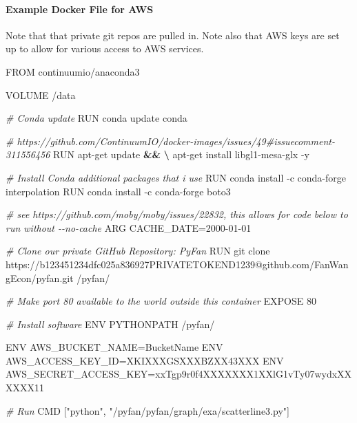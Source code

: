 \documentclass[
]{book}
\newenvironment{Shaded}{\begin{snugshade}}{\end{snugshade}}
\newcommand{\CommentTok}[1]{\textcolor[rgb]{0.56,0.35,0.01}{\textit{#1}}}
\newcommand{\ExtensionTok}[1]{#1}
\newcommand{\KeywordTok}[1]{\textcolor[rgb]{0.13,0.29,0.53}{\textbf{#1}}}
\newcommand{\NormalTok}[1]{#1}
\newcommand{\StringTok}[1]{\textcolor[rgb]{0.31,0.60,0.02}{#1}}
\begin{document}
\hypertarget{example-docker-file-for-aws}{%
\paragraph{Example Docker File for AWS}\label{example-docker-file-for-aws}}

Note that that private git repos are pulled in. Note also that AWS keys are set up to allow for various access to AWS services.

\begin{Shaded}
\begin{Highlighting}[]
\ExtensionTok{FROM}\NormalTok{ continuumio/anaconda3}

\ExtensionTok{VOLUME}\NormalTok{ /data}

\CommentTok{\# Conda update}
\ExtensionTok{RUN}\NormalTok{ conda update conda}

\CommentTok{\# https://github.com/ContinuumIO/docker{-}images/issues/49\#issuecomment{-}311556456}
\ExtensionTok{RUN}\NormalTok{ apt{-}get update }\KeywordTok{\&\&} \KeywordTok{\textbackslash{}}
    \ExtensionTok{apt{-}get}\NormalTok{ install libgl1{-}mesa{-}glx {-}y}

\CommentTok{\# Install Conda additional packages that i use}
\ExtensionTok{RUN}\NormalTok{ conda install {-}c conda{-}forge interpolation}
\ExtensionTok{RUN}\NormalTok{ conda install {-}c conda{-}forge boto3}

\CommentTok{\# see https://github.com/moby/moby/issues/22832, this allows for code below to run without {-}{-}no{-}cache}
\ExtensionTok{ARG}\NormalTok{ CACHE\_DATE=2000{-}01{-}01}

\CommentTok{\# Clone our private GitHub Repository: PyFan}
\ExtensionTok{RUN}\NormalTok{ git clone https://b123451234dfc025a836927PRIVATETOKEND1239@github.com/FanWangEcon/pyfan.git /pyfan/}

\CommentTok{\# Make port 80 available to the world outside this container}
\ExtensionTok{EXPOSE}\NormalTok{ 80}

\CommentTok{\# Install software}
\ExtensionTok{ENV}\NormalTok{ PYTHONPATH /pyfan/}

\ExtensionTok{ENV}\NormalTok{ AWS\_BUCKET\_NAME=BucketName}
\ExtensionTok{ENV}\NormalTok{ AWS\_ACCESS\_KEY\_ID=XKIXXXGSXXXBZXX43XXX}
\ExtensionTok{ENV}\NormalTok{ AWS\_SECRET\_ACCESS\_KEY=xxTgp9r0f4XXXXXXX1XXlG1vTy07wydxXXXXXX11}

\CommentTok{\# Run}
\ExtensionTok{CMD}\NormalTok{ [}\StringTok{"python"}\NormalTok{, }\StringTok{"/pyfan/pyfan/graph/exa/scatterline3.py"}\NormalTok{]}
\end{Highlighting}
\end{Shaded}
\end{document}

